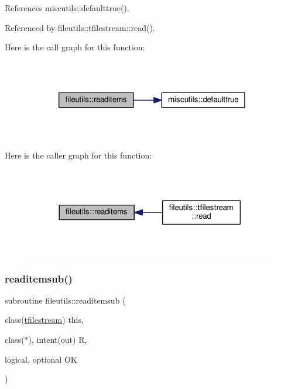 References miscutils\+::defaulttrue().



Referenced by fileutils\+::tfilestream\+::read().

Here is the call graph for this function\+:
\nopagebreak
\begin{figure}[H]
\begin{center}
\leavevmode
\includegraphics[width=320pt]{namespacefileutils_add4cb070c36870fe26122c8b1802894b_cgraph}
\end{center}
\end{figure}
Here is the caller graph for this function\+:
\nopagebreak
\begin{figure}[H]
\begin{center}
\leavevmode
\includegraphics[width=312pt]{namespacefileutils_add4cb070c36870fe26122c8b1802894b_icgraph}
\end{center}
\end{figure}
\mbox{\label{namespacefileutils_a520a8d58db5cabd4d1fcaf5fbf9eeb94}} 
\subsubsection{\texorpdfstring{readitemsub()}{readitemsub()}}
{\footnotesize\ttfamily subroutine fileutils\+::readitemsub (\begin{DoxyParamCaption}\item[{class(\mbox{\hyperlink{structfileutils_1_1tfilestream}{tfilestream}})}]{this,  }\item[{class($\ast$), intent(out)}]{R,  }\item[{logical, optional}]{OK }\end{DoxyParamCaption})\hspace{0.3cm}{\ttfamily [private]}}

